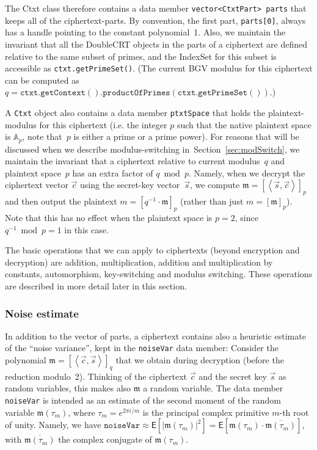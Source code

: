 \documentclass[14pt]{extarticle}
\newcommand{\secref}[1]{Section~\protect\ref{sec:#1}}
\newcommand{\A}{\mathbb{A}}
\newcommand{\grp}[1]{\left\langle #1 \right\rangle}
\def\IndexSet{\textsf{IndexSet}}
\def\DoubleCRT{\textsf{DoubleCRT}}
\def\Ctxt{\textsf{Ctxt}}
\def\EXP{\mathsf{E}}
\def\vc{\vec{c}}
\def\vs{\vec{s}}
\newcommand{\mm}{\mathfrak{m}}
\begin{document}
The {\Ctxt} class therefore contains a data member
\texttt{vector<CtxtPart> parts} that keeps all of the
ciphertext-parts. By convention, the first
part, \texttt{parts[0]}, always has a handle pointing to the constant
polynomial~1. Also, we maintain the invariant that all the
{\DoubleCRT} objects in the parts of a ciphertext are defined
relative to the same subset of primes, and the {\IndexSet} for this
subset is accessible as \texttt{ctxt.getPrimeSet()}. (The current
BGV modulus for this ciphertext can be computed as $q=\mathtt{
ctxt.getContext().productOfPrimes(ctxt.getPrimeSet())}$.)

A \texttt{Ctxt} object also contains a data member \texttt{ptxtSpace}
that holds the plaintext-modulus for this ciphertext (i.e. the integer
$p$ such that the native plaintext space is $\A_p$, note that~$p$ is
either a prime or a prime power).
For reasons that will be discussed when we describe modulus-switching
in~\secref{modSwitch}, we maintain the invariant that a ciphertext
relative to current modulus~$q$ and plaintext space~$p$ has an extra
factor of $q \bmod p$. Namely, when we decrypt the ciphertext vector
$\vc$ using the secret-key vector~$\vs$, we compute $\mm=[\grp{\vs,
\vc}]_{p}$ and then output the plaintext $m=[q^{-1}\cdot\mm]_{p}$
(rather than just $m=[\mm]_p$). Note that this has no effect when the
plaintext space is $p=2$, since $q^{-1} \bmod p=1$ in this case.

The basic operations that we can apply to ciphertexts (beyond
encryption and decryption) are addition, multiplication, addition and
multiplication by constants, automorphism, key-switching and modulus
switching. These operations are described in more detail later in
this section.

\subsubsection{Noise estimate} \label{sec:noise}
In addition to the vector of parts, a ciphertext contains also a
heuristic estimate of the ``noise variance'', kept in the
\texttt{noiseVar} data member: Consider the polynomial
$\mm=[\grp{\vc,\vs}]_q$ that we obtain during decryption (before the
reduction modulo~2). Thinking of the ciphertext $\vc$ and the secret
key $\vs$ as random variables, this makes also $\mm$ a random
variable. The data member \texttt{noiseVar} is intended as an
estimate of the second moment of the random variable $\mm(\tau_m)$,
where $\tau_m=e^{2\pi i/m}$ is the principal complex primitive $m$-th
root of unity. Namely, we have $\mathtt{noiseVar}\approx \EXP[|\mm(
\tau_m)|^2]=\EXP[\mm(\tau_m)\cdot\overline{\mm(\tau_m)}]$, with
$\overline{\mm(\tau_m)}$ the complex conjugate of $\mm(\tau_m)$.
\end{document}
